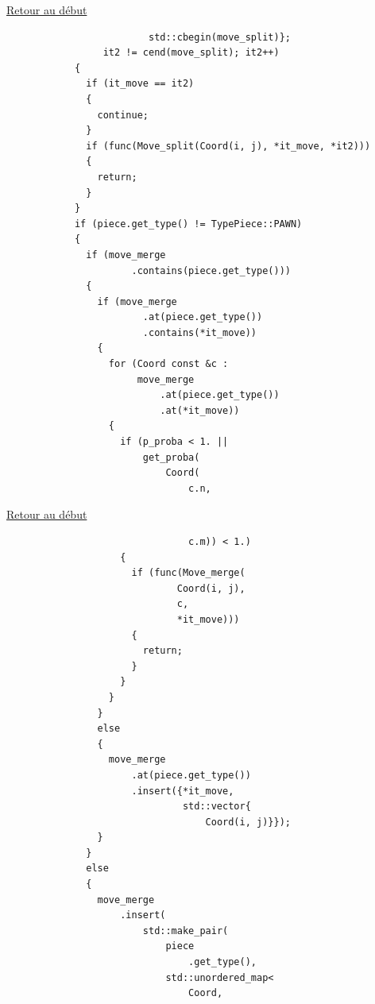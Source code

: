 {\begin{frame}[fragile]
\hyperlink{conclusion}{Retour au début}\newline
\begin{verbatim}
                         std::cbegin(move_split)};
                 it2 != cend(move_split); it2++)
            {
              if (it_move == it2)
              {
                continue;
              }
              if (func(Move_split(Coord(i, j), *it_move, *it2)))
              {
                return;
              }
            }
            if (piece.get_type() != TypePiece::PAWN)
            {
              if (move_merge
                      .contains(piece.get_type()))
              {
                if (move_merge
                        .at(piece.get_type())
                        .contains(*it_move))
                {
                  for (Coord const &c :
                       move_merge
                           .at(piece.get_type())
                           .at(*it_move))
                  {
                    if (p_proba < 1. ||
                        get_proba(
                            Coord(
                                c.n,
\end{verbatim}
\end{frame}

\begin{frame}[fragile]
\hyperlink{conclusion}{Retour au début}\newline
\begin{verbatim}
                                c.m)) < 1.)
                    {
                      if (func(Move_merge(
                              Coord(i, j),
                              c,
                              *it_move)))
                      {
                        return;
                      }
                    }
                  }
                }
                else
                {
                  move_merge
                      .at(piece.get_type())
                      .insert({*it_move,
                               std::vector{
                                   Coord(i, j)}});
                }
              }
              else
              {
                move_merge
                    .insert(
                        std::make_pair(
                            piece
                                .get_type(),
                            std::unordered_map<
                                Coord,
\end{verbatim}
\end{frame}

}
